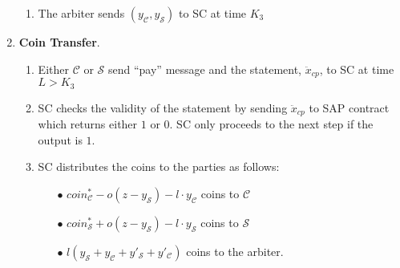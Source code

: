 \begin{enumerate}
\begin{enumerate}
\item The arbiter sends $(y_{\scriptscriptstyle\mathcal C},y_{\scriptscriptstyle\mathcal S})$  to SC at time $K_{\scriptscriptstyle 3}$
\end{enumerate}
\item \textbf{Coin Transfer}\label{RCSP::CoinTransfer}.
\begin{enumerate}
\item Either $\mathcal C$ or $\mathcal S$ send ``pay'' message and the statement, $\ddot{x}_{\scriptscriptstyle cp}$,  to SC at time $L>K_{\scriptscriptstyle 3}$
\item SC checks the validity of the statement by sending $\ddot{x}_{\scriptscriptstyle cp}$ to SAP contract which  returns  either $1$ or $0$. SC only proceeds to the next step if the output is $1$. 
\item SC distributes the coins to the parties as follows:

\begin{itemize}
\item[$\bullet$]   $coin^{\scriptscriptstyle *}_{\scriptscriptstyle\mathcal C}-o(z-y_{\scriptscriptstyle\mathcal S})-l\cdot y_{\scriptscriptstyle\mathcal C}$ coins  to $\mathcal C$
\item[$\bullet$] $coin^{\scriptscriptstyle *}_{\scriptscriptstyle\mathcal S}+o(z-y_{\scriptscriptstyle\mathcal S})-l\cdot y_{\scriptscriptstyle\mathcal S}$ coins to $\mathcal S$
\item[$\bullet$] $l(y_{\scriptscriptstyle\mathcal S}+y_{\scriptscriptstyle\mathcal C}+y'_{\scriptscriptstyle\mathcal S}+y'_{\scriptscriptstyle\mathcal C})$ coins to the arbiter.  
\end{itemize}

\end{enumerate}
\end{enumerate}



